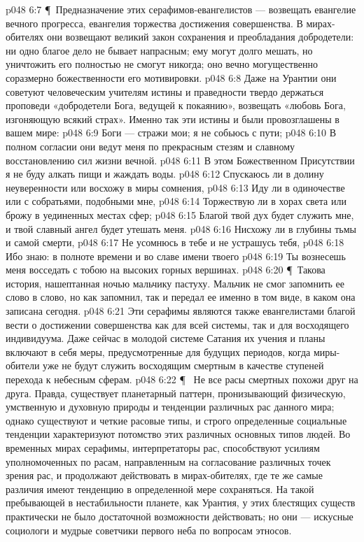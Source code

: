 \vs p048 6:7 \P\ Предназначение этих серафимов\hyp{}евангелистов --- возвещать евангелие вечного прогресса, евангелия торжества достижения совершенства. В мирах\hyp{}обителях они возвещают великий закон сохранения и преобладания добродетели: ни одно благое дело не бывает напрасным; ему могут долго мешать, но уничтожить его полностью не смогут никогда; оно вечно могущественно соразмерно божественности его мотивировки.
\vs p048 6:8 Даже на Урантии они советуют человеческим учителям истины и праведности твердо держаться проповеди «добродетели Бога, ведущей к покаянию», возвещать «любовь Бога, изгоняющую всякий страх». Именно так эти истины и были провозглашены в вашем мире:
\vs p048 6:9 Боги --- стражи мои; я не собьюсь с пути;
\vs p048 6:10 В полном согласии они ведут меня по прекрасным стезям и славному восстановлению сил жизни вечной.
\vs p048 6:11 В этом Божественном Присутствии я не буду алкать пищи и жаждать воды.
\vs p048 6:12 Спускаюсь ли в долину неуверенности или восхожу в миры сомнения,
\vs p048 6:13 Иду ли в одиночестве или с собратьями, подобными мне,
\vs p048 6:14 Торжествую ли в хорах света или брожу в уединенных местах сфер;
\vs p048 6:15 Благой твой дух будет служить мне, и твой славный ангел будет утешать меня.
\vs p048 6:16 Нисхожу ли в глубины тьмы и самой смерти,
\vs p048 6:17 Не усомнюсь в тебе и не устрашусь тебя,
\vs p048 6:18 Ибо знаю: в полноте времени и во славе имени твоего
\vs p048 6:19 Ты вознесешь меня восседать с тобою на высоких горных вершинах.
\vs p048 6:20 \P\ Такова история, нашептанная ночью мальчику пастуху. Мальчик не смог запомнить ее слово в слово, но как запомнил, так и передал ее именно в том виде, в каком она записана сегодня.
\vs p048 6:21 Эти серафимы являются также евангелистами благой вести о достижении совершенства как для всей системы, так и для восходящего индивидуума. Даже сейчас в молодой системе Сатания их учения и планы включают в себя меры, предусмотренные для будущих периодов, когда миры\hyp{}обители уже не будут служить восходящим смертным в качестве ступеней перехода к небесным сферам.
\vs p048 6:22 \P\ \bibnobreakspace {} Не все расы смертных похожи друг на друга. Правда, существует планетарный паттерн, пронизывающий физическую, умственную и духовную природы и тенденции различных рас данного мира; однако существуют и четкие расовые типы, и строго определенные социальные тенденции характеризуют потомство этих различных основных типов людей. Во временных мирах серафимы, интерпретаторы рас, способствуют усилиям уполномоченных по расам, направленным на согласование различных точек зрения рас, и продолжают действовать в мирах\hyp{}обителях, где те же самые различия имеют тенденцию в определенной мере сохраняться. На такой пребывающей в нестабильности планете, как Урантия, у этих блестящих существ практически не было достаточной возможности действовать; но они --- искусные социологи и мудрые советчики первого неба по вопросам этносов.
